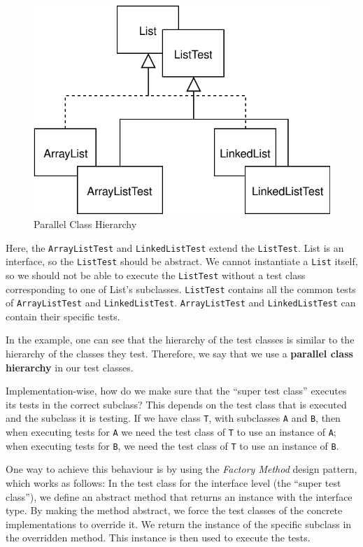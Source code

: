 \begin{figure}
\centering
\includegraphics{img/design-by-contracts/examples/parallel_architecture.svg}
\caption{Parallel Class Hierarchy}
\end{figure}

Here, the \texttt{ArrayListTest} and \texttt{LinkedListTest} extend the
\texttt{ListTest}. List is an interface, so the \texttt{ListTest} should
be abstract. We cannot instantiate a \texttt{List} itself, so we should
not be able to execute the \texttt{ListTest} without a test class
corresponding to one of List's subclasses. \texttt{ListTest} contains
all the common tests of \texttt{ArrayListTest} and
\texttt{LinkedListTest}. \texttt{ArrayListTest} and
\texttt{LinkedListTest} can contain their specific tests.

In the example, one can see that the hierarchy of the test classes is
similar to the hierarchy of the classes they test. Therefore, we say
that we use a \textbf{parallel class hierarchy} in our test classes.

Implementation-wise, how do we make sure that the ``super test class''
executes its tests in the correct subclass? This depends on the test
class that is executed and the subclass it is testing. If we have class
\texttt{T}, with subclasses \texttt{A} and \texttt{B}, then when
executing tests for \texttt{A} we need the test class of \texttt{T} to
use an instance of \texttt{A}; when executing tests for \texttt{B}, we
need the test class of \texttt{T} to use an instance of \texttt{B}.

One way to achieve this behaviour is by using the \emph{Factory Method}
design pattern, which works as follows: In the test class for the
interface level (the ``super test class''), we define an abstract method
that returns an instance with the interface type. By making the method
abstract, we force the test classes of the concrete implementations to
override it. We return the instance of the specific subclass in the
overridden method. This instance is then used to execute the tests.

